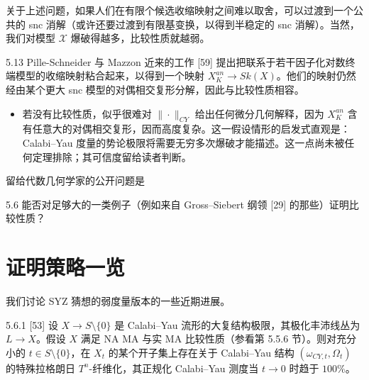 关于上述问题，如果人们在有限个候选收缩映射之间难以取舍，可以过渡到一个公共的 snc 消解（或许还要过渡到有限基变换，以得到半稳定的 snc 消解）。当然，我们对模型 $\mathcal X$ 爆破得越多，比较性质就越弱。

\begin{remark}{5.13}
Pille-Schneider 与 Mazzon 近来的工作 [59] 提出把联系于若干因子化对数终端模型的收缩映射粘合起来，以得到一个映射 $X_K^{an}\to Sk(X)$。他们的映射仍然经由某个更大 snc 模型的对偶相交复形分解，因此与比较性质相容。
\end{remark}


\begin{itemize}
\item 若没有比较性质，似乎很难对 $\|\cdot\|_{CY}$ 给出任何微分几何解释，因为 $X_K^{an}$ 含有任意大的对偶相交复形，因而高度复杂。这一假设情形的启发式直观是：Calabi--Yau 度量的势论极限将需要无穷多次爆破才能描述。这一点尚未被任何定理排除；其可信度留给读者判断。
\end{itemize}

留给代数几何学家的公开问题是

\begin{question}{5.6}
能否对足够大的一类例子（例如来自 Gross--Siebert 纲领 [29] 的那些）证明比较性质？
\end{question}


\section{证明策略一览}
我们讨论 SYZ 猜想的弱度量版本的一些近期进展。

\begin{theorem}{5.6.1}
[53] 设 $X\to S\setminus\{0\}$ 是 Calabi--Yau 流形的大复结构极限，其极化丰沛线丛为 $L\to X$。假设 $X$ 满足 NA MA 与实 MA 比较性质（参看第 5.5.6 节）。则对充分小的 $t\in S\setminus\{0\}$，在 $X_t$ 的某个开子集上存在关于 Calabi--Yau 结构 $(\omega_{CY,t},\Omega_t)$ 的特殊拉格朗日 $T^n$-纤维化，其正规化 Calabi--Yau 测度当 $t\to 0$ 时趋于 $100\%$。
\end{theorem}

